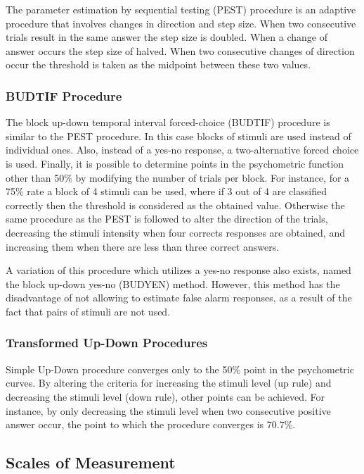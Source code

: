 \documentclass[../main.tex]{subfiles}
\begin{document}
\begin{theoreticalbackground}
The parameter estimation by sequential testing (PEST) procedure is an adaptive
procedure that involves changes in direction and step size. When two consecutive
trials result in the same answer the step size is doubled. When a change of
answer occurs the step size of halved. When two consecutive changes of direction
occur the threshold is taken as the midpoint between these two values.

\subsubsection{BUDTIF Procedure}

The block up-down temporal interval forced-choice (BUDTIF) procedure is similar
to the PEST procedure. In this case blocks of stimuli are used instead of
individual ones. Also, instead of a yes-no response, a two-alternative forced
choice is used. Finally, it is possible to determine points in the psychometric
function other than 50\% by modifying the number of trials per block. For
instance, for a 75\% rate a block of 4 stimuli can be used, where if 3 out of 4
are classified correctly then the threshold is considered as the obtained value.
Otherwise the same procedure as the PEST is followed to alter the direction of
the trials, decreasing the stimuli intensity when four corrects responses are
obtained, and increasing them when there are less than three correct answers.

A variation of this procedure which utilizes a yes-no response also exists,
named the block up-down yes-no (BUDYEN) method. However, this method has the
disadvantage of not allowing to estimate false alarm responses, as a result of
the fact that pairs of stimuli are not used.

\subsubsection{Transformed Up-Down Procedures}

Simple Up-Down procedure converges only to the 50\% point in the psychometric
curves. By altering the criteria for increasing the stimuli level (up rule) and
decreasing the stimuli level (down rule), other points can be achieved. For
instance, by only decreasing the stimuli level when two consecutive positive
answer occur, the point to which the procedure converges is 70.7\%.

\subsection{Scales of Measurement}


\end{theoreticalbackground}
\end{document}
